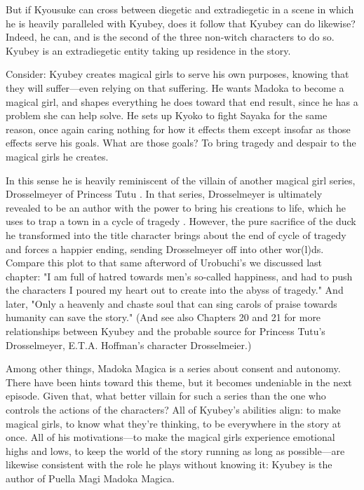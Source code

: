 But if Kyousuke can cross between diegetic and extradiegetic in a scene in which he is heavily paralleled with Kyubey, does it follow that Kyubey can do likewise? Indeed, he can, and is the second of the three non-witch characters to do so. Kyubey is an extradiegetic entity taking up residence in the story.

Consider: Kyubey creates magical girls to serve his own purposes, knowing that they will suffer—even relying on that suffering. He wants Madoka to become a magical girl, and shapes everything he does toward that end result, since he has a problem she can help solve. He sets up Kyoko to fight Sayaka for the same reason, once again caring nothing for how it effects them except insofar as those effects serve his goals. What are those goals? To bring tragedy and despair to the magical girls he creates.

In this sense he is heavily reminiscent of the villain of another magical girl series, Drosselmeyer of Princess Tutu \cite{ref41}. In that series, Drosselmeyer is ultimately revealed to be an author with the power to bring his creations to life, which he uses to trap a town in a cycle of tragedy \cite{ref42}. However, the pure sacrifice of the duck he transformed into the title character brings about the end of cycle of tragedy and forces a happier ending, sending Drosselmeyer off into other wor(l)ds. Compare this plot to that same afterword of Urobuchi's we discussed last chapter: "I am full of hatred towards men's so-called happiness, and had to push the characters I poured my heart out to create into the abyss of tragedy." And later, "Only a heavenly and chaste soul that can sing carols of praise towards humanity can save the story." \cite{ref43} (And see also Chapters 20 and 21 for more relationships between Kyubey and the probable source for Princess Tutu's Drosselmeyer, E.T.A. Hoffman's character Drosselmeier.)

Among other things, Madoka Magica is a series about consent and autonomy. There have been hints toward this theme, but it becomes undeniable in the next episode. Given that, what better villain for such a series than the one who controls the actions of the characters? All of Kyubey's abilities align: to make magical girls, to know what they're thinking, to be everywhere in the story at once. All of his motivations—to make the magical girls experience emotional highs and lows, to keep the world of the story running as long as possible—are likewise consistent with the role he plays without knowing it: Kyubey is the author of Puella Magi Madoka Magica.
